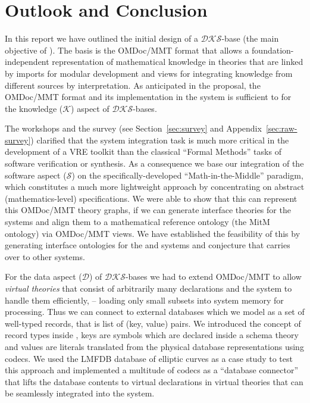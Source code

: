 \section{Outlook and Conclusion}\label{sec:conclusion}

In this report we have outlined the initial design of a $\mathcal{DKS}$-base (the main
objective of ). The basis is the OMDoc/MMT format that allows a
foundation-independent representation of mathematical knowledge in theories that are
linked by imports for modular development and views for integrating knowledge from
different sources by interpretation. As anticipated in the \pn proposal, the OMDoc/MMT
format and its implementation in the \MMT system is sufficient to for the knowledge
($\mathcal{K}$) aspect of $\mathcal{DKS}$-bases.

The \pn workshops and the survey (see Section~\ref{sec:survey} and
Appendix~\ref{sec:raw-survey}) clarified that the system integration task is much more
critical in the development of a VRE toolkit than the classical ``Formal Methods'' tasks
of software verification or synthesis. As a consequence we base our integration of the
software aspect ($\mathcal{S}$) on the specifically-developed ``Math-in-the-Middle''
paradigm, which constitutes a much more lightweight approach by concentrating on abstract
(mathematics-level) specifications. We were able to show that this can represent this
OMDoc/MMT theory graphs, if we can generate interface theories for the \pn systems and
align them to a mathematical reference ontology (the MitM ontology) via OMDoc/MMT
views. We have established the feasibility of this by generating interface ontologies for
the \GAP and \SageMath systems and conjecture that carries over to other \pn systems.

For the data aspect ($\mathcal{D}$) of $\mathcal{DKS}$-bases we had to extend OMDoc/MMT to
allow \emph{virtual theories} that consist of arbitrarily many declarations and the \MMT
system to handle them efficiently, -- loading only small subsets into system memory for
processing. Thus we can connect to external databases which we model as a set of
well-typed records, that is list of (key, value) pairs. We introduced the concept of
record types inside \MMT, keys are symbols which are declared inside a schema theory and
values are \MMT literals translated from the physical database representations using
codecs. We used the LMFDB database of elliptic curves as a case study to test this
approach and implemented a multitude of codecs as a ``database connector'' that lifts the
database contents to virtual declarations in virtual theories that can be seamlessly
integrated into the \MMT system. 

